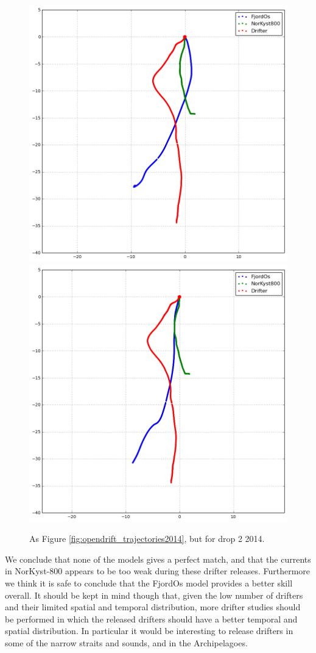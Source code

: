 \begin{figure}[htb]
	\centerline{
		\includegraphics*[width=.5\textwidth]{Figurer/opendrift/skillscore/2014drop2i1}
		\includegraphics*[width=.5\textwidth]{Figurer/opendrift/skillscore/2014drop2i1_24h}
		}
	\caption{\small As Figure \ref{fig:opendrift_trajectories2014}, but for drop 2 2014.}
	\label{fig:opendrift_trajectories2014a}
\end{figure}

We conclude that none of the models gives a perfect match, and that the currents in NorKyst-800 appears to be too weak during these drifter releases. Furthermore we think it is safe to conclude that the FjordOs model provides a better skill overall. It should be kept in mind though that, given the low number of drifters and their limited spatial and temporal distribution, more drifter studies should be performed in which the released drifters should have a better temporal and spatial distribution. In particular it would be interesting to release drifters in some of the narrow straits and sounds, and in the Archipelagoes.

